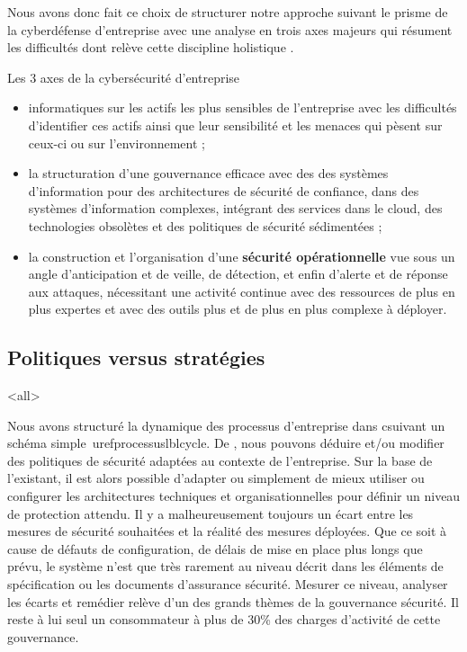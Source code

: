 Nous avons donc fait ce choix de structurer notre approche suivant le prisme de la cyberdéfense d'entreprise avec une analyse en trois axes majeurs qui résument les difficultés dont relève cette discipline holistique . 


\begin{frame}{Les 3 axes de la cybersécurité d'entreprise}
	\begin{itemize}
 \item {} informatiques sur les actifs les plus sensibles de l'entreprise avec les difficultés d'identifier ces actifs ainsi que leur sensibilité et les menaces qui pèsent sur ceux-ci ou sur l'environnement ;
\item la structuration d'une gouvernance efficace avec des  des systèmes d'information pour des architectures de sécurité de confiance, dans des systèmes d'information complexes, intégrant des services dans le cloud, des technologies obsolètes et des politiques de sécurité sédimentées ;
\item la construction et l’organisation d'une \textbf{sécurité opérationnelle} vue sous un angle d'anticipation et de veille, de détection, et enfin d'alerte et de réponse aux attaques, nécessitant une activité continue avec des ressources de plus en plus expertes et avec des outils plus  et de plus en plus complexe à déployer.
\end{itemize}
\end{frame}

\subsection {Politiques versus stratégies}


\mode<all>{}


Nous avons structuré la dynamique des processus d'entreprise dans c\edoc suivant un schéma simple\ uref{processus}{lblcycle}.
De  , nous pouvons déduire et/ou modifier des politiques de sécurité adaptées au contexte de l'entreprise. 
Sur la base de l’existant, il est alors possible d’adapter ou simplement de mieux utiliser ou configurer les architectures techniques et organisationnelles pour définir un niveau de protection attendu.
Il y a malheureusement toujours un écart entre les mesures de sécurité souhaitées et la réalité des mesures déployées. Que ce soit à cause de défauts de configuration, de délais de mise en place plus longs que prévu, le système n’est que très rarement au niveau décrit dans les éléments de spécification ou les documents d'assurance sécurité.
Mesurer ce niveau, analyser les écarts et remédier relève d’un des grands thèmes de la gouvernance sécurité. Il reste à lui seul un consommateur à plus de 30\% des charges d'activité de cette gouvernance.


